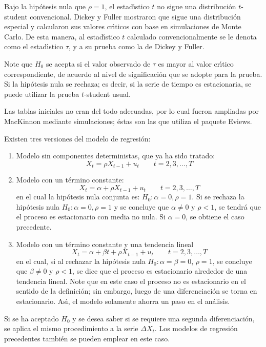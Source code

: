 Bajo la hip\'{o}tesis nula que $\rho =1$, el estad\'{\i}stico $t$ no sigue 
una distribuci\'{o}n $t$-student convencional. Dickey y Fuller mostraron que sigue una distribuci\'{o}n especial y calcularon sus valores cr\'{\i}ticos con base en simulaciones de Monte Carlo. De esta manera, al estad\'{\i}stico $t$ calculado 
convencionalmente se le denota como el estad\'{\i}stico $\tau $, y a su 
prueba como la de Dickey y Fuller.

Note que $H_{0}$ se acepta si el valor observado de $\tau $ es mayor al 
valor cr\'{\i}tico correspondiente, de acuerdo al nivel de significaci\'{o}n 
que se adopte para la prueba. Si la hip\'{o}tesis nula se rechaza; es decir, 
si la serie de tiempo es estacionaria, se puede utilizar la prueba $t$-student usual.

Las tablas iniciales no eran del todo adecuadas, por lo cual fueron 
ampliadas por MacKinnon mediante simulaciones; \'{e}stas son las que utiliza 
el paquete Eviews.

Existen tres versiones del modelo de regresi\'{o}n:
\begin{enumerate}
 \item Modelo sin componentes deterministas, que ya ha sido tratado:
\[
X_{t}=\rho X_{t-1}+u_{t}   \qquad   t=2,3,\ldots ,T
\]
\item Modelo con un t\'{e}rmino constante:
\[
X_{t}=\alpha +\rho X_{t-1}+u_{t} \qquad t=2,3,\ldots,T
\]
en el cual la hip\'{o}tesis nula conjunta es: $H_{0}:\alpha =0,  
\rho =1.$ Si se rechaza la hip\'{o}tesis nula $H_{0}:\alpha =0,  
\rho =1$ y se concluye que $\alpha \ne 0$ y $\rho <1$, se tendr\'{a} que el 
proceso es estacionario con media no nula. Si $\alpha =0$, se obtiene el 
caso precedente.

\item Modelo con un t\'{e}rmino constante y una tendencia lineal
\[
X_{t}=\alpha +\beta t+\rho X_{t-1}+u_{t} \qquad t=2,3,\ldots,T
\]
en el cual, si al rechazar la hip\'{o}tesis nula $H_{0}:\alpha =\beta 
=0$,  $\rho =1$, se concluye que $\beta \ne 0$ y $\rho <1$, se dice 
que el proceso es estacionario alrededor de una tendencia lineal. Note que 
en este caso el proceso no es estacionario en el sentido de la 
definici\'{o}n; sin embargo, luego de una diferenciaci\'{o}n se torna en 
estacionario. As\'{\i}, el modelo solamente ahorra un paso en el 
an\'{a}lisis.
\end{enumerate}

Si se ha aceptado $H_{0}$ y se desea saber si se requiere una segunda 
diferenciaci\'{o}n, se aplica el mismo procedimiento a la serie $\Delta 
X_{t}$. Los modelos de regresi\'{o}n precedentes tambi\'{e}n se pueden 
emplear en este caso.


